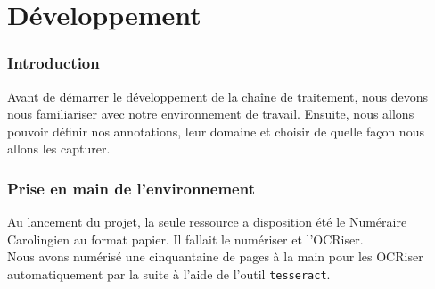 \documentclass[a4paper, 11pt]{report}
\begin{document}
\part{Développement}
	\section*{Introduction}
	Avant de démarrer le développement de la chaîne de traitement, nous devons nous familiariser avec notre environnement de travail. Ensuite, nous allons pouvoir définir nos annotations, leur domaine et choisir de quelle façon nous allons les capturer.
	\section{Prise en main de l'environnement}
	Au lancement du projet, la seule ressource a disposition été le Numéraire Carolingien au format papier. Il fallait le numériser et l'OCRiser.\\
    Nous avons numérisé une cinquantaine de pages à la main pour les OCRiser automatiquement par la suite à l'aide de l'outil \texttt{tesseract}.\\
\end{document}
